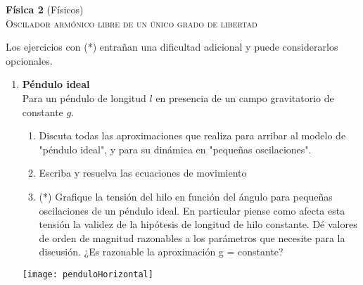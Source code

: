 \documentclass[11pt,spanish,a4paper]{article}
\begin{document}
\begin{center}
\textbf{Física 2} (Físicos) \hfill {}\\
	\textsc{\LARGE Oscilador armónico libre de un único grado de libertad}\\
\end{center}

Los ejercicios con (*) entrañan una dificultad adicional y puede considerarlos opcionales.

\begin{enumerate}

\item 
\begin{minipage}[t][6.2cm]{0.7\textwidth}
\textbf{Péndulo ideal}\\
Para un péndulo de longitud $l$ en presencia de un campo gravitatorio de constante $g$.
\begin{enumerate}
	\item Discuta todas las aproximaciones que realiza para arribar al modelo de "péndulo ideal", y para su dinámica en "pequeñas oscilaciones".
	\item Escriba y resuelva las ecuaciones de movimiento 
	\item (*) Grafique la tensión del hilo en función del ángulo para pequeñas oscilaciones de un péndulo ideal.
	En particular piense como afecta esta tensión la validez de la hipótesis de longitud de hilo constante.
	Dé valores de orden de magnitud razonables a los parámetros que necesite para la discusión.
	¿Es razonable la aproximación g = constante?
\end{enumerate}
\end{minipage}
\begin{minipage}[c][0cm][t]{0.25\textwidth}
  \texttt{[image: penduloHorizontal]}
\end{minipage}




\end{enumerate}
\end{document}
